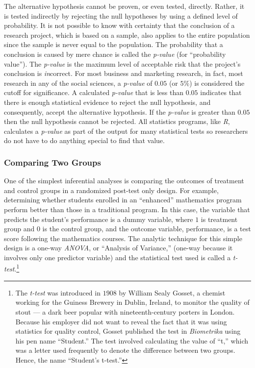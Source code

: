 The alternative hypothesis cannot be proven, or even tested, directly. Rather, it is tested indirectly by rejecting the null hypotheses by using a defined level of probability. It is not possible to know with certainty that the conclusion of a research project, which is based on a sample, also applies to the entire population since the sample is never equal to the population. The probability that a conclusion is caused by mere chance is called the \textit{p-value} (for ``probability value''). The \textit{p-value} is the maximum level of acceptable risk that the project's conclusion is \textit{in}correct. For most business and marketing research, in fact, most research in any of the social sciences, a \textit{p-value} of $ 0.05 $ (or $ 5\% $) is considered the cutoff for significance. A calculated \textit{p-value} that is less than $ 0.05 $ indicates that there is enough statistical evidence to reject the null hypothesis, and consequently, accept the alternative hypothesis. If the \textit{p-value} is greater than $ 0.05 $ then the null hypothesis cannot be rejected. All statistics programs, like \textit{R}, calculates a \textit{p-value} as part of the output for many statistical tests so researchers do not have to do anything special to find that value.

\subsubsection{Comparing Two Groups}

One of the simplest inferential analyses is comparing the outcomes of treatment and control groups in a randomized post-test only design. For example, determining whether students enrolled in an ``enhanced'' mathematics program perform better than those in a traditional program. In this case, the variable that predicts the student's performance is a dummy variable, where $ 1 $ is treatment group and $ 0 $ is the control group, and the outcome variable, performance, is a test score following the mathematics courses. The analytic technique for this simple design is a one-way \textit{ANOVA}, or ``Analysis of Variance,'' (one-way because it involves only one predictor variable) and the statistical test used is called a \textit{t-test}.\footnote{The \textit{t-test} was introduced in $ 1908 $ by William Sealy Gosset, a chemist working for the Guiness Brewery in Dublin, Ireland, to monitor the quality of stout --- a dark beer popular with nineteenth-century porters in London. Because his employer did not want to reveal the fact that it was using statistics for quality control, Gosset published the test in \textit{Biometrika} using his pen name ``Student.'' The test involved calculating the value of ``t,'' which was a letter used frequently to denote the difference between two groups. Hence, the name ``Student's t-test.''}

